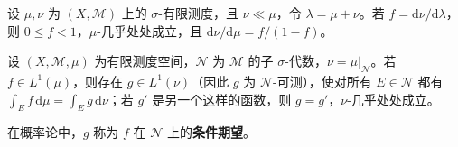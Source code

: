\documentclass[../../main.tex]{subfiles}%
\begin{document}
\begin{exercise}\label{exercise:ch03-radon-nikodym-sum}
设 $\mu,\nu$ 为 $(X,\mathscr{M})$ 上的 $\sigma$-有限测度，且 $\nu\ll\mu$，令 $\lambda=\mu+\nu$。若 $f=\mathrm{d}\nu/\mathrm{d}\lambda$，则 $0\le f<1$，$\mu$-几乎处处成立，且 $\mathrm{d}\nu/\mathrm{d}\mu=f/(1-f)$。
\end{exercise}
\begin{exercise}\label{exercise:ch03-conditional-expectation}
设 $(X,\mathscr{M},\mu)$ 为有限测度空间，$\mathscr{N}$ 为 $\mathscr{M}$ 的子 $\sigma$-代数，$\nu=\mu|_{\mathscr{N}}$。若 $f\in L^1(\mu)$，则存在 $g\in L^1(\nu)$（因此 $g$ 为 $\mathscr{N}$-可测），使对所有 $E\in\mathscr{N}$ 都有 $\int_E f\,\mathrm{d}\mu=\int_E g\,\mathrm{d}\nu$；若 $g'$ 是另一个这样的函数，则 $g=g'$，$\nu$-几乎处处成立。
\begin{definition*}[条件期望]
在概率论中，$g$ 称为 $f$ 在 $\mathscr{N}$ 上的\textbf{条件期望}。
\end{definition*}
\end{exercise}
\end{document}
